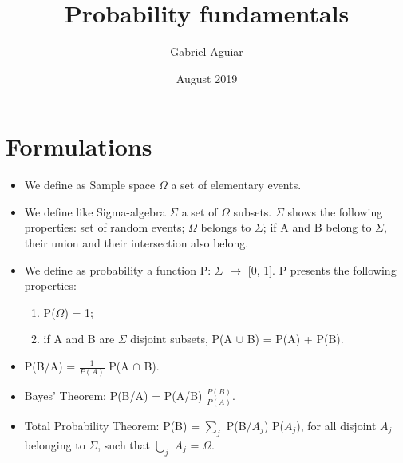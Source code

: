\documentclass{article}
\title{Probability fundamentals}
\author{Gabriel Aguiar}
\date{August 2019}
\begin{document}
\maketitle

\section{Formulations}

\begin{itemize}
    
\item We define as Sample space $\Omega$ a set of elementary events.
        
\item We define like Sigma-algebra $\Sigma$ a set of $\Omega$ subsets. $\Sigma$ shows the following properties: set of random events; $\Omega$ belongs to $\Sigma$; if A and B belong to $\Sigma$, their union and their intersection also belong.

\item We define as probability a function P: $\Sigma$ $\rightarrow$ [0, 1]. P presents the following properties: 
\begin{enumerate}
\item P($\Omega$) = 1; 
\item if A and B are $\Sigma$ disjoint subsets, P(A $\cup$ B) = P(A) + P(B).
\end{enumerate}

\item P(B/A) = $\frac{1}{P(A)}$ P(A $\cap$ B).

\item Bayes' Theorem: P(B/A) = P(A/B) $\frac{P(B)}{P(A)}$.

\item Total Probability Theorem: P(B) = $\sum\limits_{j}$ P(B/$A_{j}$) P($A_{j}$), for all disjoint $A_{j}$ belonging to $\Sigma$, such that $\bigcup\limits_{j}$ $A_{j}$ = $\Omega$.



        
\end{itemize}
\end{document}
